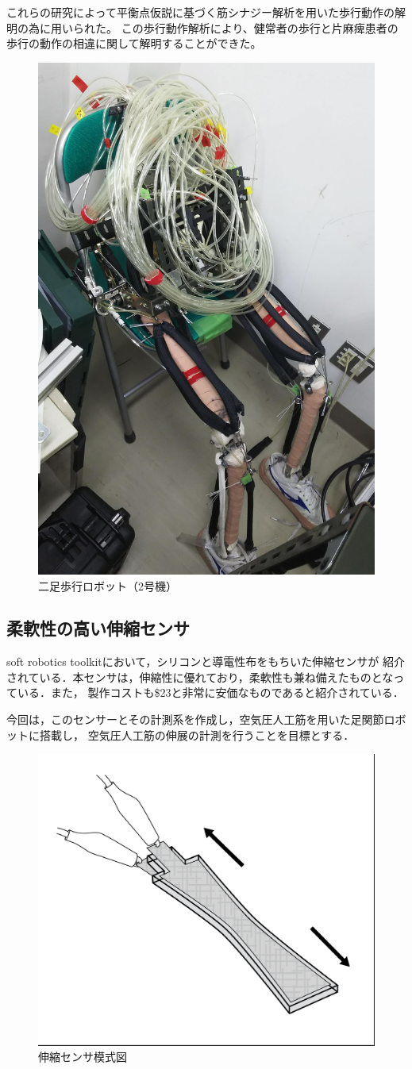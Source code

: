 これらの研究によって平衡点仮説に基づく筋シナジー解析を用いた歩行動作の解明の為に用いられた。
この歩行動作解析により、健常者の歩行と片麻痺患者の歩行の動作の相違に関して解明することができた。
\begin{figure}[h]
  \begin{center}
  \includegraphics[width=0.35\columnwidth,clip]{./1_prolusion/2nd.eps}
  \caption{二足歩行ロボット（2号機）}
  \label{2号機}
 \end{center}
\end{figure}

\newpage

\subsection{柔軟性の高い伸縮センサ}%
soft robotics toolkit\cite{MITSoftRobot}において，シリコンと導電性布をもちいた伸縮センサが
紹介されている．本センサは，伸縮性に優れており，柔軟性も兼ね備えたものとなっている．また，
製作コストも\$23と非常に安価なものであると紹介されている．

今回は，このセンサーとその計測系を作成し，空気圧人工筋を用いた足関節ロボットに搭載し，
空気圧人工筋の伸展の計測を行うことを目標とする．
\begin{figure}[h]
    \begin{center}
        \includegraphics[width=0.5\columnwidth]{./1_prolusion/MITSoftRobotics.eps}
        \caption{伸縮センサ模式図\cite{MITSoftRobot}}
        \label{MITSoftRobot表紙}
    \end{center}
\end{figure}

